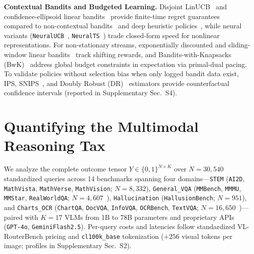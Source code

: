\documentclass[10pt,twocolumn,letterpaper]{article}
\begin{document}
\textbf{Contextual Bandits and Budgeted Learning.} Disjoint LinUCB~\citep{li2010contextual} and confidence-ellipsoid linear bandits~\citep{abbasi2011improved} provide finite-time regret guarantees compared to non-contextual bandits~\citep{auer2002ucb} and deep heuristic policies~\citep{mnih2015dqn,agrawal2013thompson}, while neural variants (\texttt{NeuralUCB}~\citep{zhou2020neuralucb}, \texttt{NeuralTS}~\citep{zhang2021neuralts}) trade closed-form speed for nonlinear representations. For non-stationary streams, exponentially discounted and sliding-window linear bandits~\citep{garivier2011discounted} track shifting rewards, and Bandits-with-Knapsacks (BwK)~\citep{agrawal2016bwk} address global budget constraints in expectation via primal-dual pacing. To validate policies without selection bias when only logged bandit data exist, IPS, SNIPS~\citep{swaminathan2015self}, and Doubly Robust (DR)~\citep{dudik2011doubly} estimators provide counterfactual confidence intervals (reported in Supplementary Sec.~S4).

\section{Quantifying the Multimodal Reasoning Tax}
\label{sec:tax}

We analyze the complete outcome tensor $Y \in \{0,1\}^{N \times K}$ over $N = 30{,}540$ standardized queries across 14 benchmarks spanning four domains---\texttt{STEM} (\texttt{AI2D}, \texttt{MathVista}, \texttt{MathVerse}, \texttt{MathVision}; $N{=}8{,}332$), \texttt{General\_VQA} (\texttt{MMBench}, \texttt{MMMU}, \texttt{MMStar}, \texttt{RealWorldQA}; $N{=}4{,}607$~\citep{liu2024mmbench,yue2024mmmu,chen2024mmstar}), \texttt{Hallucination} (\texttt{HallusionBench}; $N{=}951$), and \texttt{Charts\_OCR} (\texttt{ChartQA}, \texttt{DocVQA}, \texttt{InfoVQA}, \texttt{OCRBench}, \texttt{TextVQA}; $N{=}16{,}650$~\citep{mathew2022infographicvqa,singh2019textvqa})---paired with $K=17$ VLMs from 1B to 78B parameters and proprietary APIs (\texttt{GPT-4o}, \texttt{GeminiFlash2.5}). Per-query costs and latencies follow standardized VL-RouterBench pricing and \texttt{cl100k\_base} tokenization ($+256$ visual tokens per image; profiles in Supplementary Sec.~S2).
\end{document}

